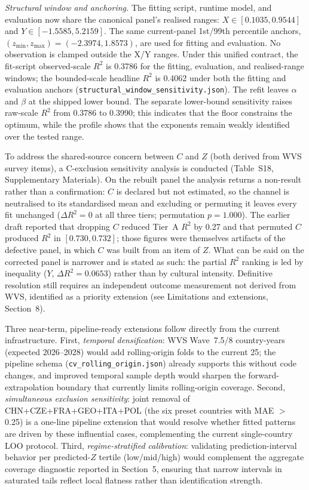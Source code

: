 \documentclass[11pt]{article}
\begin{document}
\emph{Structural window and anchoring.} The fitting script, runtime model, and evaluation now share the canonical panel's realised ranges: $X\in[0.1035,0.9544]$ and $Y\in[-1.5585,5.2159]$. The same current-panel 1st/99th percentile anchors, $(z_{\min},z_{\max})=(-2.3974,1.8573)$, are used for fitting and evaluation. No observation is clamped outside the X/Y ranges. Under this unified contract, the fit-script observed-scale $R^2$ is \num{0.3786} for the fitting, evaluation, and realised-range windows; the bounded-scale headline $R^2$ is \num{0.4062} under both the fitting and evaluation anchors (\texttt{structural\_window\_sensitivity.json}). The refit leaves $\alpha$ and $\beta$ at the shipped lower bound. The separate lower-bound sensitivity raises raw-scale $R^2$ from \num{0.3786} to \num{0.3990}; this indicates that the floor constrains the optimum, while the profile shows that the exponents remain weakly identified over the tested range.

To address the shared-source concern between $C$ and $Z$ (both derived from WVS survey items), a C-exclusion sensitivity analysis is conducted (Table~S18, Supplementary Materials). On the rebuilt panel the analysis returns a non-result rather than a confirmation: $C$ is declared but not estimated, so the channel is neutralised to its standardised mean and excluding or permuting it leaves every fit unchanged ($\Delta R^2 = 0$ at all three tiers; permutation $p = 1.000$). The earlier draft reported that dropping $C$ reduced Tier~A $R^2$ by \num{0.27} and that permuted $C$ produced $R^2$ in $[0.730, 0.732]$; those figures were themselves artifacts of the defective panel, in which $C$ was built from an item of $Z$. What can be said on the corrected panel is narrower and is stated as such: the partial $R^2$ ranking is led by inequality ($Y$, $\Delta R^2 = \num{0.0653}$) rather than by cultural intensity. Definitive resolution still requires an independent outcome measurement not derived from WVS, identified as a priority extension (see Limitations and extensions, Section~8).

Three near-term, pipeline-ready extensions follow directly from the current infrastructure. First, \emph{temporal densification}: WVS Wave~7.5/8 country-years (expected 2026--2028) would add rolling-origin folds to the current 25; the pipeline schema (\texttt{cv\_rolling\_origin.json}) already supports this without code changes, and improved temporal sample depth would sharpen the forward-extrapolation boundary that currently limits rolling-origin coverage. Second, \emph{simultaneous exclusion sensitivity}: joint removal of CHN+CZE+FRA+GEO+ITA+POL (the six preset countries with MAE $>$ 0.25) is a one-line pipeline extension that would resolve whether fitted patterns are driven by these influential cases, complementing the current single-country LOO protocol. Third, \emph{regime-stratified calibration}: validating prediction-interval behavior per predicted-$Z$ tertile (low/mid/high) would complement the aggregate coverage diagnostic reported in Section~5, ensuring that narrow intervals in saturated tails reflect local flatness rather than identification strength.
\end{document}

